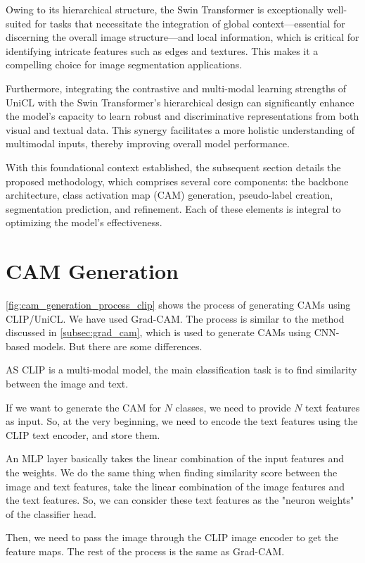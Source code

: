 Owing to its hierarchical structure, the Swin Transformer is exceptionally well-suited for tasks that necessitate the integration of global context—essential for discerning the overall image structure—and local information, which is critical for identifying intricate features such as edges and textures. This makes it a compelling choice for image segmentation applications.

Furthermore, integrating the contrastive and multi-modal learning strengths of UniCL with the Swin Transformer’s hierarchical design can significantly enhance the model’s capacity to learn robust and discriminative representations from both visual and textual data. This synergy facilitates a more holistic understanding of multimodal inputs, thereby improving overall model performance.

With this foundational context established, the subsequent section details the proposed methodology, which comprises several core components: the backbone architecture, class activation map (CAM) generation, pseudo-label creation, segmentation prediction, and refinement. Each of these elements is integral to optimizing the model’s effectiveness.

\section{CAM Generation}
\label{sec:cam_generation}

\autoref{fig:cam_generation_process_clip} shows the process of generating CAMs using CLIP/UniCL. We have used Grad-CAM. The process is similar to the method discussed in \autoref{subsec:grad_cam}, which is used to generate CAMs using CNN-based models.
 But there are some differences.

AS CLIP is a multi-modal model, the main classification task is to find similarity between the image and text.

If we want to generate the CAM for $N$ classes, we need to provide $N$ text features as input. So, at the very beginning, we need to encode the text features using the CLIP text encoder, and store them.

An MLP layer basically takes the linear combination of the input features and the weights. We do the same thing when finding similarity score between the image and text features, take the linear combination of the image features and the text features. So, we can consider these text features as the "neuron weights" of the classifier head.

Then, we need to pass the image through the CLIP image encoder to get the feature maps. The rest of the process is the same as Grad-CAM.



